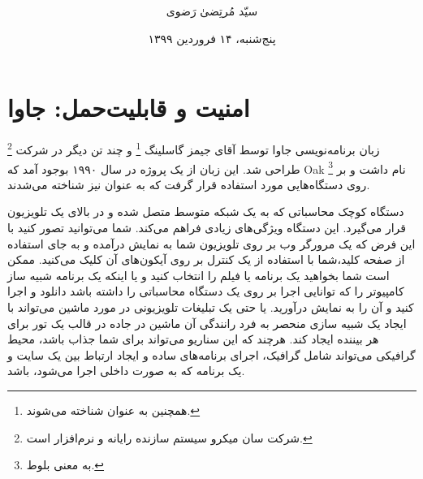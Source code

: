 \documentclass[a4paper,12pt]{report}
\begin{document}
	
	\renewcommand{\bibname}{مراجع}
	
	\title{
	}
	\author{
		سیّد مُرتِضیٰ رَضوی
	}
	\date{
		پنج‌شنبه، ۱۴ فروردین ۱۳۹۹
	}
	
	\maketitle
	\setcounter{page}{384}
	
	\setcounter{chapter}{12}
	\chapter{امنیت و قابلیت‌حمل: جاوا}\label{chap13}
	زبان برنامه‌نویسی جاوا
	 توسط آقای جیمز گاسلینگ 
	\footnote{
		همچنین به عنوان
		شناخته می‌شوند.}
	و چند تن دیگر در شرکت 
	\footnote{شرکت سان میکرو سیستم سازنده رایانه و نرم‌افزار است.}
	طراحی شد.
	این زبان از یک پروژه در سال ۱۹۹۰ بوجود آمد که 
	Oak \footnote{
	به معنی بلوط.}
	 نام داشت و بر روی دستگاه‌هایی مورد استفاده قرار گرفت که به عنوان 
	 نیز شناخته می‌شدند.
	 
	 دستگاه کوچک محاسباتی که به یک شبکه متوسط متصل شده و در بالای یک تلویزیون قرار می‌گیرد. این دستگاه ويژگی‌های زیادی فراهم می‌کند. شما می‌توانید تصور کنید با این فرض که یک مرورگر وب بر روی تلویزیون شما به نمایش درآمده و به جای استفاده از صفحه کلید،شما ‌با استفاده از یک کنترل بر روی آیکون‌های آن کلیک می‌کنید. 
	 ممکن است  شما بخواهید یک برنامه یا فیلم را انتخاب کنید و یا اینکه یک برنامه شبیه ساز کامپیوتر را که توانایی اجرا بر روی یک دستگاه محاسباتی را داشته باشد دانلود و اجرا کنید و آن را به نمایش درآورید. 
	 یا حتی یک تبلیغات تلویزیونی در مورد ماشین می‌تواند با ایجاد یک شبیه سازی منحصر   به فرد رانندگی آن ماشین در جاده در قالب یک تور برای هر بیننده ایجاد کند.
	 هرچند که این سناریو می‌تواند برای شما جذاب باشد، محیط گرافیکی می‌تواند شامل گرافیک، اجرای برنامه‌های ساده و ایجاد ارتباط بین یک سایت و یک برنامه که به صورت داخلی اجرا می‌شود، باشد.
	 
\end{document}
